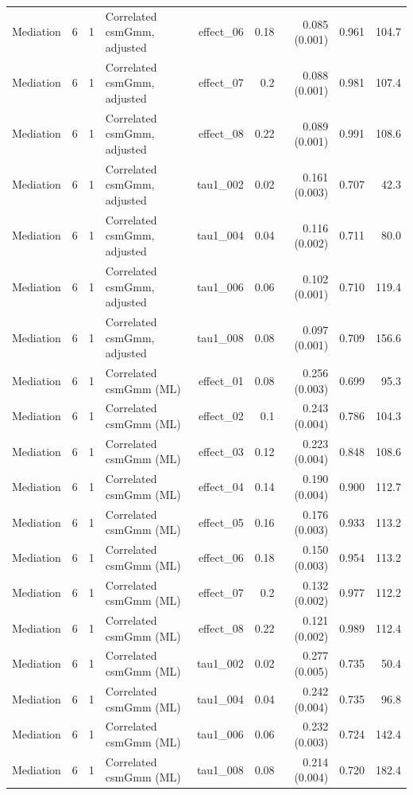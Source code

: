 \begin{longtable}{lcclrrrrr}
Mediation & 6 & 1 & Correlated csmGmm, adjusted & effect\_06 & 0.18 & 0.085 (0.001) & 0.961 & 104.7\\
Mediation & 6 & 1 & Correlated csmGmm, adjusted & effect\_07 & 0.2 & 0.088 (0.001) & 0.981 & 107.4\\
Mediation & 6 & 1 & Correlated csmGmm, adjusted & effect\_08 & 0.22 & 0.089 (0.001) & 0.991 & 108.6\\
Mediation & 6 & 1 & Correlated csmGmm, adjusted & tau1\_002 & 0.02 & 0.161 (0.003) & 0.707 & 42.3\\
Mediation & 6 & 1 & Correlated csmGmm, adjusted & tau1\_004 & 0.04 & 0.116 (0.002) & 0.711 & 80.0\\
Mediation & 6 & 1 & Correlated csmGmm, adjusted & tau1\_006 & 0.06 & 0.102 (0.001) & 0.710 & 119.4\\
Mediation & 6 & 1 & Correlated csmGmm, adjusted & tau1\_008 & 0.08 & 0.097 (0.001) & 0.709 & 156.6\\
Mediation & 6 & 1 & Correlated csmGmm (ML) & effect\_01 & 0.08 & 0.256 (0.003) & 0.699 & 95.3\\
Mediation & 6 & 1 & Correlated csmGmm (ML) & effect\_02 & 0.1 & 0.243 (0.004) & 0.786 & 104.3\\
Mediation & 6 & 1 & Correlated csmGmm (ML) & effect\_03 & 0.12 & 0.223 (0.004) & 0.848 & 108.6\\
Mediation & 6 & 1 & Correlated csmGmm (ML) & effect\_04 & 0.14 & 0.190 (0.004) & 0.900 & 112.7\\
Mediation & 6 & 1 & Correlated csmGmm (ML) & effect\_05 & 0.16 & 0.176 (0.003) & 0.933 & 113.2\\
Mediation & 6 & 1 & Correlated csmGmm (ML) & effect\_06 & 0.18 & 0.150 (0.003) & 0.954 & 113.2\\
Mediation & 6 & 1 & Correlated csmGmm (ML) & effect\_07 & 0.2 & 0.132 (0.002) & 0.977 & 112.2\\
Mediation & 6 & 1 & Correlated csmGmm (ML) & effect\_08 & 0.22 & 0.121 (0.002) & 0.989 & 112.4\\
Mediation & 6 & 1 & Correlated csmGmm (ML) & tau1\_002 & 0.02 & 0.277 (0.005) & 0.735 & 50.4\\
Mediation & 6 & 1 & Correlated csmGmm (ML) & tau1\_004 & 0.04 & 0.242 (0.004) & 0.735 & 96.8\\
Mediation & 6 & 1 & Correlated csmGmm (ML) & tau1\_006 & 0.06 & 0.232 (0.003) & 0.724 & 142.4\\
Mediation & 6 & 1 & Correlated csmGmm (ML) & tau1\_008 & 0.08 & 0.214 (0.004) & 0.720 & 182.4\\

\end{longtable}
